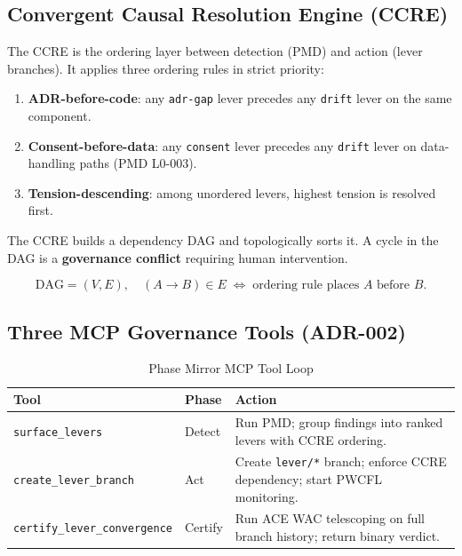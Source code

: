 \documentclass[12pt,a4paper]{article}
\theoremstyle{definition}
\theoremstyle{plain}
\theoremstyle{remark}
\begin{document}
\subsection{Convergent Causal Resolution Engine (CCRE)}

The CCRE is the ordering layer between detection (PMD) and action
(lever branches). It applies three ordering rules in strict priority:

\begin{enumerate}
  \item \textbf{ADR-before-code}: any \texttt{adr-gap} lever precedes any
    \texttt{drift} lever on the same component.
  \item \textbf{Consent-before-data}: any \texttt{consent} lever precedes
    any \texttt{drift} lever on data-handling paths (PMD L0-003).
  \item \textbf{Tension-descending}: among unordered levers,
    highest tension is resolved first.
\end{enumerate}

The CCRE builds a dependency DAG and topologically sorts it. A cycle in the
DAG is a \textbf{governance conflict} requiring human intervention.

\begin{equation}
  \mathrm{DAG} = (V, E), \quad
  (A \to B) \in E \;\Leftrightarrow\;
  \text{ordering rule places } A \text{ before } B.
\end{equation}

\subsection{Three MCP Governance Tools (ADR-002)}

\begin{table}[h!]
\centering
\caption{Phase Mirror MCP Tool Loop}
\begin{tabular}{llp{6.5cm}}
\toprule
\textbf{Tool} & \textbf{Phase} & \textbf{Action} \\
\midrule
\texttt{surface\_levers}          & Detect  & Run PMD; group findings into ranked levers with CCRE ordering. \\
\texttt{create\_lever\_branch}    & Act     & Create \texttt{lever/*} branch; enforce CCRE dependency; start PWCFL monitoring. \\
\texttt{certify\_lever\_convergence} & Certify & Run ACE WAC telescoping on full branch history; return binary verdict. \\
\bottomrule
\end{tabular}
\end{table}
\end{document}
